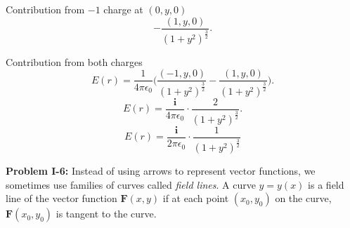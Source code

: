 \documentclass[11pt]{article}
\begin{document}
		Contribution from $-1$ charge at $(0,y,0)$
		\[
			- \frac{(1,y,0)}{(1+y^2)^{\frac{3}{2}}}
		.\] 

		Contribution from both charges
		\[
			E(r) = \frac{1}{4\pi\epsilon_0} \biggl(\frac{(-1,y,0)}{(1+y^2)^{\frac{3}{2}}} - \frac{(1,y,0)}{(1+y^2)^{\frac{3}{2}}}\biggr)
		.\] 
		\[
			E(r) = \frac{\mathbf{i}}{4\pi\epsilon_0} \cdot \frac{2}{(1+y^2)^{\frac{3}{2}}}
		.\] 
		\[
			\boxed{E(r)= \frac{\mathbf{i}}{2\pi\epsilon_0} \cdot \frac{1}{(1+y^2)^{\frac{3}{2}}}}
		\]

		\textbf{Problem I-6:} Instead of using arrows to represent vector functions, we sometimes use families of curves called \textit{field lines}. A curve $y=y(x)$ is a field line of the vector function  $\mathbf{F}(x, y)$ if at each point $(x_0 ,y_0)$ on the curve, $\mathbf{F} (x_0, y_0)$ is tangent to the curve.
\end{document}
